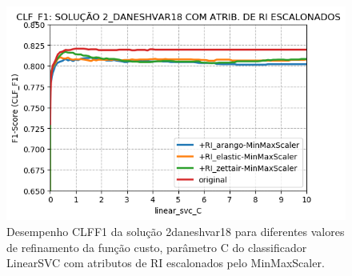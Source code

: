 \begin{figure}[ht]
    \centering
    \caption{Desempenho CLF\underscore{}F1 da solução 2\underscore{}daneshvar18 para diferentes valores de refinamento da função custo, parâmetro C do classificador LinearSVC com atributos de RI escalonados pelo MinMaxScaler.}
    \vspace{-0.5cm}
    \begin{center}
        \includegraphics[scale=0.75]{img/clf-f1-2-daneshvar18-ir-scaled.png}
    \end{center}
    \vspace{-0.5cm}
    \label{fig:clf-f1-2-daneshvar18-ir-scaled}
\end{figure}